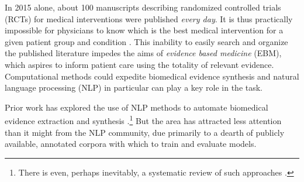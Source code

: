 \documentclass[11pt,a4paper]{article}
\begin{document}
In 2015 alone, about 100 manuscripts describing randomized controlled trials (RCTs) for medical interventions were published \emph{every day}. It is thus practically impossible for physicians to know which is the best medical intervention for a given patient group and condition  \cite{borah2017analysis,fraser2010impossibility,bastian2010seventy}.
This inability to easily search and organize the published literature impedes the aims of \emph{evidence based medicine} (EBM), which aspires to inform patient care using the totality of %
relevant evidence. %
Computational methods could expedite biomedical evidence synthesis \cite{tsafnat2013automation,wallace2013modernizing} and natural language processing (NLP) in particular can play a key role in the task. 


Prior work has explored the use of NLP methods to automate biomedical evidence extraction and synthesis \cite{boudin2010positional,marshall:2017:ACL,ferracane2016leveraging,verbeke2012statistical}.\footnote{There is even, perhaps inevitably, a systematic review of such approaches \cite{jonnalagadda2015automating}.} But the area has attracted less attention than it might from the NLP community, due primarily to a dearth of publicly available, annotated corpora with which to train and evaluate models. %
\end{document}
